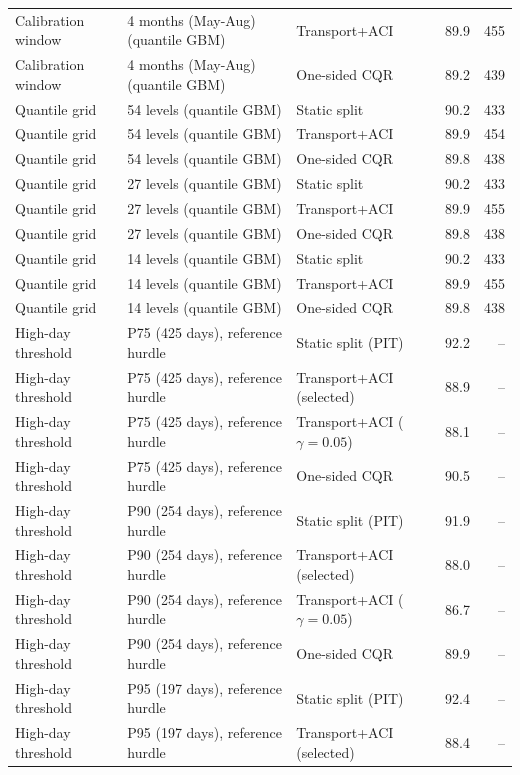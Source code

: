 \begin{table}[tp]
\begin{tabular}{l l l rr}
Calibration window & 4 months (May-Aug) (quantile GBM) & Transport+ACI & 89.9 & 455 \\
Calibration window & 4 months (May-Aug) (quantile GBM) & One-sided CQR & 89.2 & 439 \\
\midrule
Quantile grid & 54 levels (quantile GBM) & Static split & 90.2 & 433 \\
Quantile grid & 54 levels (quantile GBM) & Transport+ACI & 89.9 & 454 \\
Quantile grid & 54 levels (quantile GBM) & One-sided CQR & 89.8 & 438 \\
Quantile grid & 27 levels (quantile GBM) & Static split & 90.2 & 433 \\
Quantile grid & 27 levels (quantile GBM) & Transport+ACI & 89.9 & 455 \\
Quantile grid & 27 levels (quantile GBM) & One-sided CQR & 89.8 & 438 \\
Quantile grid & 14 levels (quantile GBM) & Static split & 90.2 & 433 \\
Quantile grid & 14 levels (quantile GBM) & Transport+ACI & 89.9 & 455 \\
Quantile grid & 14 levels (quantile GBM) & One-sided CQR & 89.8 & 438 \\
\midrule
High-day threshold & P75 (425 days), reference hurdle & Static split (PIT) & 92.2 & -- \\
High-day threshold & P75 (425 days), reference hurdle & Transport+ACI (selected) & 88.9 & -- \\
High-day threshold & P75 (425 days), reference hurdle & Transport+ACI ($\gamma=0.05$) & 88.1 & -- \\
High-day threshold & P75 (425 days), reference hurdle & One-sided CQR & 90.5 & -- \\
High-day threshold & P90 (254 days), reference hurdle & Static split (PIT) & 91.9 & -- \\
High-day threshold & P90 (254 days), reference hurdle & Transport+ACI (selected) & 88.0 & -- \\
High-day threshold & P90 (254 days), reference hurdle & Transport+ACI ($\gamma=0.05$) & 86.7 & -- \\
High-day threshold & P90 (254 days), reference hurdle & One-sided CQR & 89.9 & -- \\
High-day threshold & P95 (197 days), reference hurdle & Static split (PIT) & 92.4 & -- \\
High-day threshold & P95 (197 days), reference hurdle & Transport+ACI (selected) & 88.4 & -- \\

\end{tabular}
\end{table}
